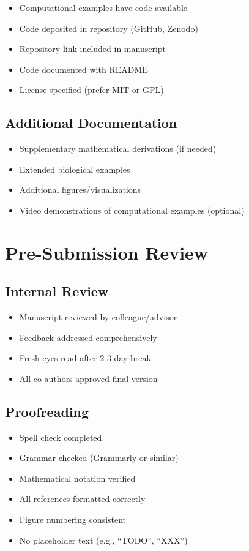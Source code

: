 \documentclass[11pt]{article}
\begin{document}
\begin{itemize}[label=$\square$]
    \item Computational examples have code available
    \item Code deposited in repository (GitHub, Zenodo)
    \item Repository link included in manuscript
    \item Code documented with README
    \item License specified (prefer MIT or GPL)
\end{itemize}

\subsection{Additional Documentation}

\begin{itemize}[label=$\square$]
    \item Supplementary mathematical derivations (if needed)
    \item Extended biological examples
    \item Additional figures/visualizations
    \item Video demonstrations of computational examples (optional)
\end{itemize}

\section{Pre-Submission Review}

\subsection{Internal Review}

\begin{itemize}[label=$\square$]
    \item Manuscript reviewed by colleague/advisor
    \item Feedback addressed comprehensively
    \item Fresh-eyes read after 2-3 day break
    \item All co-authors approved final version
\end{itemize}

\subsection{Proofreading}

\begin{itemize}[label=$\square$]
    \item Spell check completed
    \item Grammar checked (Grammarly or similar)
    \item Mathematical notation verified
    \item All references formatted correctly
    \item Figure numbering consistent
    \item No placeholder text (e.g., ``TODO'', ``XXX'')
\end{itemize}
\end{document}
